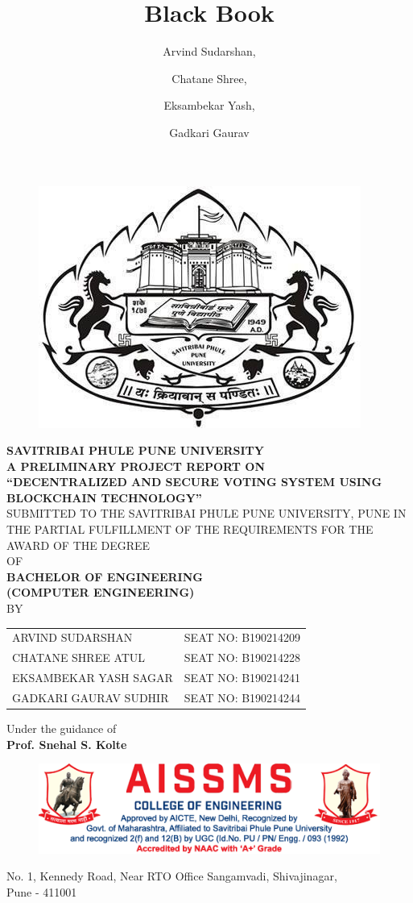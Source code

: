 \documentclass[oneside, 12pt]{book}
\title{Black Book}
\author{
  Arvind Sudarshan,
  \and
  Chatane Shree,
  \and
  Eksambekar Yash,
  \and
  Gadkari Gaurav
}
\begin{document}
	\pagestyle{plain}
	\renewcommand{\headrulewidth}{0pt}
	\titleformat{\chapter}[display]{\bfseries\centering}{\chaptertitlename}{20pt}{\Large\uppercase}

	\frontmatter

	\begin{titlepage}
		\centering
		\begin{figure}[H]
			\centering
			\includegraphics[width=0.4\linewidth]{./Resources/sppu.png}
		\end{figure}
		\textbf{SAVITRIBAI PHULE PUNE UNIVERSITY}\break
		\\\textbf{A PRELIMINARY PROJECT REPORT ON}\break
		\\{\large\textbf{“DECENTRALIZED AND SECURE VOTING SYSTEM USING BLOCKCHAIN TECHNOLOGY”}}\break
		\\SUBMITTED TO THE SAVITRIBAI PHULE PUNE UNIVERSITY, PUNE IN THE PARTIAL FULFILLMENT OF THE REQUIREMENTS FOR THE AWARD OF THE DEGREE\break
		\\OF\break
		\\{\large\textbf{BACHELOR OF ENGINEERING\\(COMPUTER ENGINEERING)}}\break
		\\BY\break
		\begin{table}[H]
			\centering
			\begin{tabular}{lr}
				ARVIND SUDARSHAN      & SEAT NO: B190214209 \\
				CHATANE SHREE ATUL    & SEAT NO: B190214228 \\
				EKSAMBEKAR YASH SAGAR & SEAT NO: B190214241 \\
				GADKARI GAURAV SUDHIR & SEAT NO: B190214244
			\end{tabular}
		\end{table}
		Under the guidance of\break
		\\\textbf{Prof. Snehal S. Kolte}\break
		\begin{figure}[H]
			\centering
			\includegraphics[width=\linewidth]{./Resources/letterhead2.png}
		\end{figure}
		No. 1, Kennedy Road, Near RTO Office Sangamvadi, Shivajinagar,\\Pune - 411001
		\restoregeometry
	\end{titlepage}
	
\end{document}
